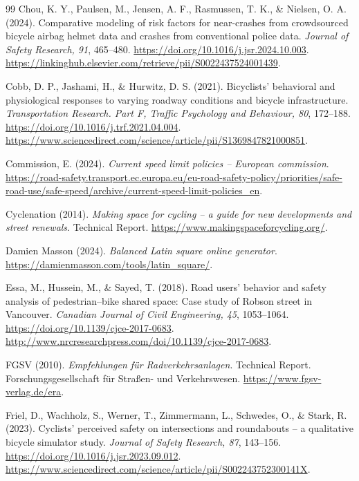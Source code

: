 \begin{thebibliography}{99}
Chou, K. Y., Paulsen, M., Jensen, A. F., Rasmussen, T. K., \& Nielsen, O. A.
(2024). Comparative modeling of risk factors for near-crashes from crowdsourced
bicycle airbag helmet data and crashes from conventional police data.
\emph{Journal of Safety Research, 91}, 465--480.
\url{https://doi.org/10.1016/j.jsr.2024.10.003}.
\url{https://linkinghub.elsevier.com/retrieve/pii/S0022437524001439}.

Cobb, D. P., Jashami, H., \& Hurwitz, D. S. (2021). Bicyclists' behavioral and
physiological responses to varying roadway conditions and bicycle
infrastructure. \emph{Transportation Research. Part F, Traffic Psychology and
Behaviour, 80}, 172--188. \url{https://doi.org/10.1016/j.trf.2021.04.004}.
\url{https://www.sciencedirect.com/science/article/pii/S1369847821000851}.

Commission, E. (2024). \emph{Current speed limit policies -- European
commission}.
\url{https://road-safety.transport.ec.europa.eu/eu-road-safety-policy/priorities/safe-road-use/safe-speed/archive/current-speed-limit-policies_en}.

Cyclenation (2014). \emph{Making space for cycling -- a guide for new
developments and street renewals}. Technical Report.
\url{https://www.makingspaceforcycling.org/}.

Damien Masson (2024). \emph{Balanced Latin square online generator}.
\url{https://damienmasson.com/tools/latin_square/}.

Essa, M., Hussein, M., \& Sayed, T. (2018). Road users' behavior and safety
analysis of pedestrian--bike shared space: Case study of Robson street in
Vancouver. \emph{Canadian Journal of Civil Engineering, 45}, 1053--1064.
\url{https://doi.org/10.1139/cjce-2017-0683}.
\url{http://www.nrcresearchpress.com/doi/10.1139/cjce-2017-0683}.

FGSV (2010). \emph{Empfehlungen für Radverkehrsanlagen}. Technical Report.
Forschungsgesellschaft für Straßen- und Verkehrswesen.
\url{https://www.fgsv-verlag.de/era}.

Friel, D., Wachholz, S., Werner, T., Zimmermann, L., Schwedes, O., \& Stark, R.
(2023). Cyclists' perceived safety on intersections and roundabouts -- a
qualitative bicycle simulator study. \emph{Journal of Safety Research, 87},
143--156. \url{https://doi.org/10.1016/j.jsr.2023.09.012}.
\url{https://www.sciencedirect.com/science/article/pii/S002243752300141X}.


\end{thebibliography}
